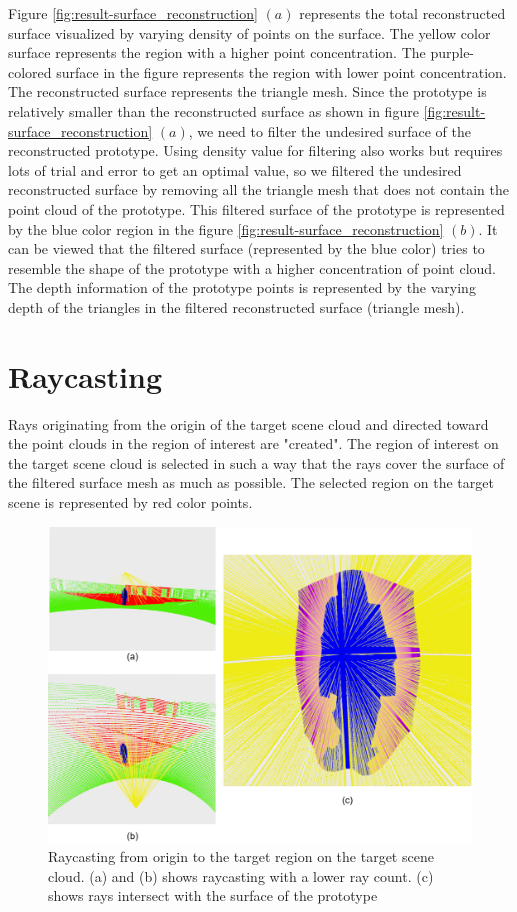 Figure \ref{fig:result-surface_reconstruction} \((a)\) represents the total reconstructed surface visualized by varying density of points on the surface. The yellow color surface represents the region with a higher point concentration. The purple-colored surface in the figure represents the region with lower point concentration. The reconstructed surface represents the triangle mesh. Since the prototype is relatively smaller than the reconstructed surface as shown in figure \ref{fig:result-surface_reconstruction} \((a)\), we need to filter the undesired surface of the reconstructed prototype. Using density value for filtering also works but requires lots of trial and error to get an optimal value, so we filtered the undesired reconstructed surface by removing all the triangle mesh that does not contain the point cloud of the prototype. This filtered surface of the prototype is represented by the blue color region in the figure \ref{fig:result-surface_reconstruction} \((b)\). It can be viewed that the filtered surface (represented by the blue color) tries to resemble the shape of the prototype with a higher concentration of point cloud. The depth information of the prototype points is represented by the varying depth of the triangles in the filtered reconstructed surface (triangle mesh).

\section{Raycasting}
Rays originating from the origin of the target scene cloud and directed toward the point clouds in the region of interest are "created". The region of interest on the target scene cloud is selected in such a way that the rays cover the surface of the filtered surface mesh as much as possible. The selected region on the target scene is represented by red color points.

\begin{figure}[htbp]
    \centering
    \includegraphics[width=1\linewidth]{97_graphics/results/raycasting_from_origin.pdf}
    \caption{Raycasting from origin to the target region on the target scene cloud. (a) and (b) shows raycasting with a lower ray count. (c) shows rays intersect with the surface of the prototype}
    \label{fig:result-raycasting_from_origin}
\end{figure}

